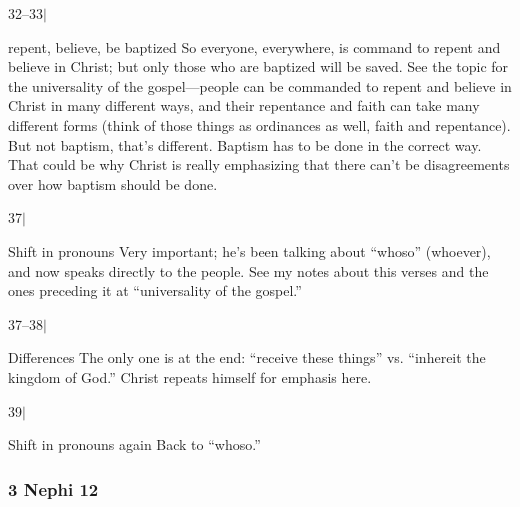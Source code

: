 \begin{compactdesc}
		\item[32--33$\vert$]
		\begin{compactdesc}
		\item[repent, believe, be baptized] So everyone, everywhere, is command to repent and believe in Christ; but only those who are baptized will be saved. See the topic for the universality of the gospel---people can be commanded to repent and believe in Christ in many different ways, and their repentance and faith can take many different forms (think of those things as ordinances as well, faith and repentance). But not baptism, that's different. Baptism has to be done in the correct way. That could be why Christ is really emphasizing that there can't be disagreements over how baptism should be done.
		\end{compactdesc}
		
		\item[37$\vert$]
		\begin{compactdesc}
		\item[Shift in pronouns] Very important; he's been talking about ``whoso'' (whoever), and now speaks directly to the people. See my notes about this verses and the ones preceding it at ``universality of the gospel.''
		\end{compactdesc}
		
		\item[37--38$\vert$]
		\begin{compactdesc}
		\item[Differences] The only one is at the end: ``receive these things'' vs. ``inhereit the kingdom of God.'' Christ repeats himself for emphasis here.
		\end{compactdesc}
		
		\item[39$\vert$]
		\begin{compactdesc}
		\item[Shift in pronouns again] Back to ``whoso.''
		\end{compactdesc}
		
		\end{compactdesc}
		
	\subsubsection{3 Nephi 12} %
	
